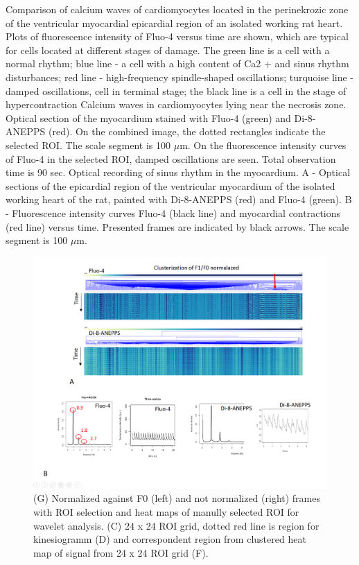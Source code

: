 \documentclass{biophys-new}
\begin{document}
Comparison of calcium waves of cardiomyocytes located in the perinekrozic zone of the ventricular myocardial epicardial region of an isolated working rat heart. Plots of fluorescence intensity of Fluo-4 versus time are shown, which are typical for cells located at different stages of damage. The green line is a cell with a normal rhythm; blue line - a cell with a high content of Ca2 + and sinus rhythm disturbances; red line - high-frequency spindle-shaped oscillations; turquoise line - damped oscillations, cell in terminal stage; the black line is a cell in the stage of hypercontraction
Calcium waves in cardiomyocytes lying near the necrosis zone. Optical section of the myocardium stained with Fluo-4 (green) and Di-8-ANEPPS (red). On the combined image, the dotted rectangles indicate the selected ROI. The scale segment is 100 $\mu$m. On the fluorescence intensity curves of Fluo-4 in the selected ROI, damped oscillations are seen. Total observation time is 90 sec.
Optical recording of sinus rhythm in the myocardium. A - Optical sections of the epicardial region of the ventricular myocardium of the isolated working heart of the rat, painted with Di-8-ANEPPS (red) and Fluo-4 (green). B - Fluorescence intensity curves Fluo-4 (black line) and myocardial contractions (red line) versus time. Presented frames are indicated by black arrows. The scale segment is 100 $\mu$m.

\begin{figure}
    \includegraphics[width=0.9\linewidth]{fig6.png}
    \caption{(G) Normalized against F0 (left) and not normalized (right) frames with ROI selection and heat maps of manully selected ROI for wavelet analysis. (C) 24 x 24 ROI grid, dotted red line is region for kinesiogramm (D) and correspondent region from clustered heat map of signal from 24 x 24 ROI grid (F).}
    \label{fig:fig6}
\end{figure}
\end{document}

